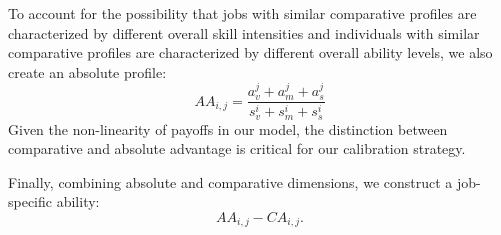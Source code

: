 \documentclass[onehalfspacing,11pt]{article}
\begin{document}
	To account for the possibility that jobs with similar comparative profiles are characterized by different overall skill intensities and individuals with similar comparative profiles are characterized by different overall ability levels, we also create an absolute profile:
	\[AA_{i,j}=\frac{a^j_v+a^j_m+a^j_s}{s^i_v+s^i_m+s^i_s}\]
	Given the non-linearity of payoffs in our model, the distinction between comparative and absolute advantage is critical for our calibration strategy.
	
	Finally, combining absolute and comparative dimensions, we construct a job-specific ability:
	\[AA_{i,j}-CA_{i,j}.\]
	
	
	
	
\end{document}
